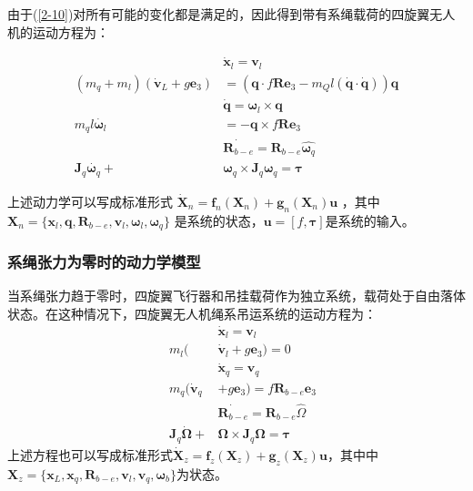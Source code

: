 \documentclass[lang=chs, degree=master, blindreview=false, winfonts=true]{yanputhesis}
\begin{document}
由于(\ref{2-10})对所有可能的变化都是满足的，因此得到带有系绳载荷的四旋翼无人机的运动方程为：

\begin{equation}
	\begin{aligned}
		&\dot{\bm x}_{l}=\bm v_{l} \\
		(m_q+m_l)(\dot{\bm v}_L+g\bm e_3)& =(\bm q\cdot f\bm R\bm e_3-m_Ql(\dot{\bm q}\cdot\dot{\bm q}))\bm q \\
		&\dot{\bm q}=\bm \omega_l\times \bm q \\
		m_{q}l \dot{\bm \omega_l}&=-\bm q\times f\bm R\bm e_{3} \\
		&\dot{\bm R_{b-e}}=\bm R_{b-e}\hat{\bm  \omega_q} \\
		\bm J_{q}\dot{\bm  \omega_q}+&\bm  \omega_q\times \bm J_{q}\bm  \omega_q=\bm \tau
	\end{aligned}
\end{equation}

上述动力学可以写成标准形式 $\dot{\bm X}_n=\bm f_n(\bm X_n)+\bm g_n(\bm X_n)\bm u$ ，其中 $\bm X_n = \{\bm x_l,\bm q,\bm R_{b-e},\bm v_l,\bm \omega_l,\bm \omega_q\}$ 是系统的状态，$\bm u = \left[f,\bm \tau \right]$是系统的输入。
\subsubsection{系绳张力为零时的动力学模型}
当系绳张力趋于零时，四旋翼飞行器和吊挂载荷作为独立系统，载荷处于自由落体状态。在这种情况下，四旋翼无人机绳系吊运系统的运动方程为：
\begin{equation}
	\begin{aligned}
	&\dot{\bm x}_{l}=\bm v_{l}\\
	\quad m_{l}(&\dot{\bm v}_{l}+g\bm e_{3})=0\\
	&\dot{\bm x}_{q}=\bm v_{q}\\
	\quad m_{q}(\dot{\bm v}_{q}&+g\bm e_{3})=f\bm R_{b-e}\bm e_{3}\\
	&\dot{\bm R_{b-e}}=\bm R_{b-e}\hat{\Omega}\\
	\quad \bm J_{q}\dot{\bm \Omega}+&\bm \Omega\times \bm J_{q}\bm \Omega=\bm \tau
\end{aligned}
\end{equation}
上述方程也可以写成标准形式$\dot{\bm X}_z=\bm f_z(\bm X_z)+\bm g_z(\bm X_z)\bm u$，其中中$\bm X_z = \{\bm x_L,\bm x_q,\bm R_{b-e},\bm v_l,\bm v_q,\bm \omega_b\}$为状态。
\end{document}
